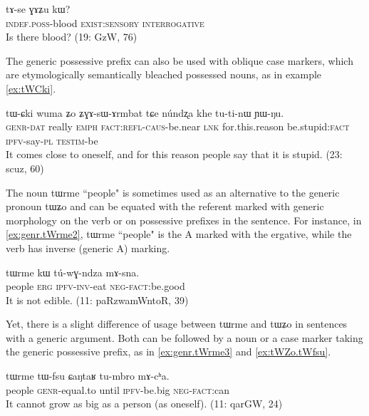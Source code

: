 \documentclass[oldfontcommands,oneside,a4paper,11pt]{article}
\newcommand{\ipa}[1]{{\phon \mbox{#1}}} %
\begin{document}
\begin{exe}
\ex  \label{ex:tAse}
\gll
\ipa{tɤ-se} 	\ipa{ɣɤʑu} 	\ipa{kɯ?} \\
\textsc{indef.poss}-blood \textsc{exist:sensory} \textsc{interrogative} \\
\glt Is there blood? (19: GzW, 76)
\end{exe}

The generic possessive prefix can also be used with oblique case markers, which are etymologically semantically bleached possessed nouns, as in example \ref{ex:tWCki}.

\begin{exe}
\ex  \label{ex:tWCki}
\gll
\ipa{tɯ-ɕki} 	\ipa{wuma} 	\ipa{ʑo} 	\ipa{ʑɣɤ-sɯ-ɤrmbat} 	\ipa{tɕe} 	\ipa{núndʐa} 	\ipa{khe} 	\ipa{tu-ti-nɯ} 	\ipa{ɲɯ-ŋu.} \\
\textsc{genr-dat} really \textsc{emph} \textsc{fact:refl-caus}-be.near \textsc{lnk} for.this.reason be.stupid:\textsc{fact} \textsc{ipfv}-say-\textsc{pl} \textsc{testim}-be \\
\glt It comes close to oneself, and for this reason people say that it is stupid. (23: scuz, 60)
\end{exe}

The noun \ipa{tɯrme} ``people" is sometimes used as an alternative to the generic pronoun \ipa{tɯʑo} and can be equated with the referent marked with generic morphology on the verb or on possessive prefixes in the sentence. For instance, in \ref{ex:genr.tWrme2}, \ipa{tɯrme} ``people" is the A marked with the ergative, while the verb has inverse (generic A) marking.


\begin{exe}
\ex  \label{ex:genr.tWrme2}
\gll
\ipa{tɯrme} 	\ipa{kɯ} 	\ipa{tú-wɣ-ndza} 	\ipa{mɤ-sna.} \\
people \textsc{erg} \textsc{ipfv-inv}-eat \textsc{neg-fact}:be.good \\
\glt It is not edible. (11: paRzwamWntoR, 39)
\end{exe}

Yet, there is a slight difference of usage between \ipa{tɯrme} and \ipa{tɯʑo} in sentences with a generic argument. Both can be followed by a noun or a case marker taking the generic possessive prefix, as in \ref{ex:genr.tWrme3} and \ref{ex:tWZo.tWfsu}. 

\begin{exe}
\ex  \label{ex:genr.tWrme3}
\gll
\ipa{tɯrme} 	\ipa{tɯ-fsu} 	\ipa{ɕaŋtaʁ} 	\ipa{tu-mbro} 	\ipa{mɤ-cʰa.} \\
people \textsc{genr}-equal.to until \textsc{ipfv}-be.big \textsc{neg-fact}:can \\ 
\glt It cannot grow as big as a person (as oneself). (11: qarGW, 24)
\end{exe}
\end{document}

